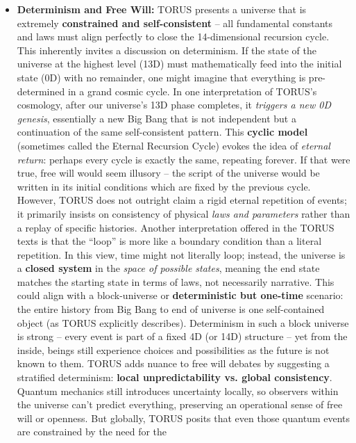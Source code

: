 \documentclass[]{article}
\begin{document}
\begin{itemize}
\item
  \textbf{Determinism and Free Will:} TORUS presents a universe that is
  extremely \textbf{constrained and self-consistent} -- all fundamental
  constants and laws must align perfectly to close the 14-dimensional
  recursion cycle​. This inherently invites a discussion on determinism.
  If the state of the universe at the highest level (13D) must
  mathematically feed into the initial state (0D) with no remainder, one
  might imagine that everything is pre-determined in a grand cosmic
  cycle. In one interpretation of TORUS's cosmology, after our
  universe's 13D phase completes, it \emph{triggers a new 0D genesis},
  essentially a new Big Bang that is not independent but a continuation
  of the same self-consistent pattern​. This \textbf{cyclic model}
  (sometimes called the Eternal Recursion Cycle) evokes the idea of
  \emph{eternal return}: perhaps every cycle is exactly the same,
  repeating forever. If that were true, free will would seem illusory --
  the script of the universe would be written in its initial conditions
  which are fixed by the previous cycle. However, TORUS does not
  outright claim a rigid eternal repetition of events; it primarily
  insists on consistency of physical \emph{laws and parameters} rather
  than a replay of specific histories. Another interpretation offered in
  the TORUS texts is that the ``loop'' is more like a boundary condition
  than a literal repetition​. In this view, time might not literally
  loop; instead, the universe is a \textbf{closed system} in the
  \emph{space of possible states}, meaning the end state matches the
  starting state in terms of laws, not necessarily narrative. This could
  align with a block-universe or \textbf{deterministic but one-time}
  scenario: the entire history from Big Bang to end of universe is one
  self-contained object (as TORUS explicitly describes)​. Determinism in
  such a block universe is strong -- every event is part of a fixed 4D
  (or 14D) structure -- yet from the inside, beings still experience
  choices and possibilities as the future is not known to them. TORUS
  adds nuance to free will debates by suggesting a stratified
  determinism: \textbf{local unpredictability vs. global consistency}.
  Quantum mechanics still introduces uncertainty locally, so observers
  within the universe can't predict everything, preserving an
  operational sense of free will or openness. But globally, TORUS posits
  that even those quantum events are constrained by the need for the

\end{itemize}
\end{document}
